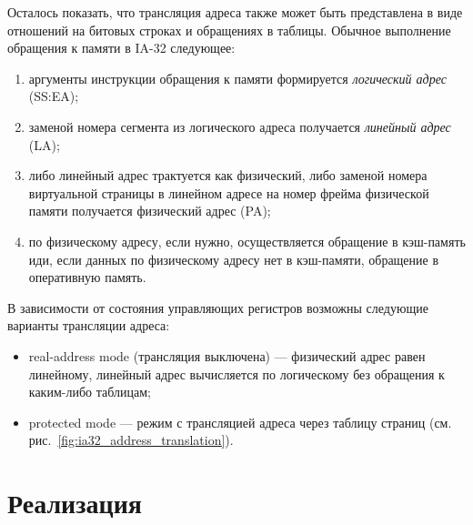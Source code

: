 Осталось показать, что трансляция адреса также может быть представлена в виде
отношений на битовых строках и обращениях в таблицы. Обычное выполнение
обращения к памяти в IA-32 следующее:
\begin{enumerate}
    \item аргументы инструкции обращения к памяти формируется \emph{логический
адрес} (SS:EA);
    \item заменой номера сегмента из логического адреса получается
\emph{линейный адрес} (LA);
    \item либо линейный адрес трактуется как физический, либо заменой номера
виртуальной страницы в линейном адресе на номер фрейма физической памяти
получается физический адрес (PA);
    \item по физическому адресу, если нужно, осуществляется обращение в
кэш-память иди, если данных по физическому адресу нет в кэш-памяти, обращение в
оперативную память.
\end{enumerate}

В зависимости от состояния управляющих регистров возможны следующие варианты трансляции адреса:
\begin{itemize}
  \item real-address mode (трансляция выключена) --- физический адрес равен линейному, линейный адрес вычисляется по логическому без обращения к каким-либо таблицам;
  \item protected mode --- режим с трансляцией адреса через таблицу страниц (см. рис.~\ref{fig:ia32_address_translation}).
\end{itemize}



\section{Реализация}

